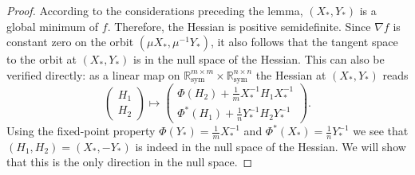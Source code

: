 \documentclass[a4paper]{article}
\newcommand{\R}{\mathbb{R}}
\theoremstyle{definition}
\numberwithin{equation}{section}
\begin{document}
\begin{proof}
According to the considerations preceding the lemma, $(X_*,Y_*)$ is a global minimum of $f$. Therefore, the Hessian is positive semidefinite. Since $\nabla f$ is constant zero on the orbit $(\mu X_*, \mu^{-1} Y_*)$, it also follows that the tangent space to the orbit at $(X_*,Y_*)$ is in the null space of the Hessian. This can also be verified directly: as a linear map on $\R^{m \times m}_{\mathrm{sym}} \times \R^{n \times n}_{\mathrm{sym}}$ the Hessian at $(X_*,Y_*)$ reads
\[
\begin{pmatrix}
 H_1 \\ H_2
\end{pmatrix}
\mapsto
\begin{pmatrix}
 \Phi(H_2) + \frac{1}{m} X_*^{-1} H_1 X_*^{-1} \\ \Phi^*(H_1) + \frac{1}{n} Y_*^{-1} H_2 Y_*^{-1}
\end{pmatrix}.
\]
Using the fixed-point property $\Phi(Y_*) = \frac{1}{m} X_*^{-1}$ and $\Phi^*(X_*) = \frac{1}{n} Y_*^{-1}$ we see that $(H_1,H_2) = (X_*,-Y_*)$ is indeed in the null space of the Hessian. We will show that this is the only direction in the null space.


\end{proof}
\end{document}

